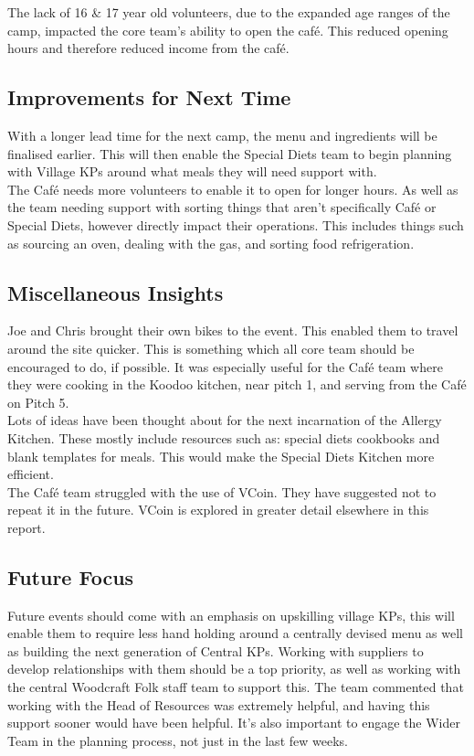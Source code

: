 The lack of 16 \& 17 year old volunteers, due to the expanded age ranges of the camp, impacted the core team's ability to open the café. This reduced opening hours and therefore reduced income from the café.
\subsection{Improvements for Next Time}
With a longer lead time for the next camp, the menu and ingredients will be finalised earlier. This will then enable the Special Diets team to begin planning with Village KPs around what meals they will need support with.\\

The Café needs more volunteers to enable it to open for longer hours. As well as the team needing support with sorting things that aren't specifically Café or Special Diets, however directly impact their operations. This includes things such as sourcing an oven, dealing with the gas, and sorting food refrigeration.
\subsection{Miscellaneous Insights}
Joe and Chris brought their own bikes to the event. This enabled them to travel around the site quicker. This is something which all core team should be encouraged to do, if possible. It was especially useful for the Café team where they were cooking in the Koodoo kitchen, near pitch 1, and serving from the Café on Pitch 5. \\

Lots of ideas have been thought about for the next incarnation of the Allergy Kitchen. These mostly include resources such as: special diets cookbooks and blank templates for meals. This would make the Special Diets Kitchen more efficient. \\

The Café team struggled with the use of VCoin. They have suggested not to repeat it in the future. VCoin is explored in greater detail elsewhere in this report.
\subsection{Future Focus}
Future events should come with an emphasis on upskilling village KPs, this will enable them to require less hand holding around a centrally devised menu as well as building the next generation of Central KPs. Working with suppliers to develop relationships with them should be a top priority, as well as working with the central Woodcraft Folk staff team to support this. The team commented that working with the Head of Resources was extremely helpful, and having this support sooner would have been helpful. It's also important to engage the Wider Team in the planning process, not just in the last few weeks.\\

